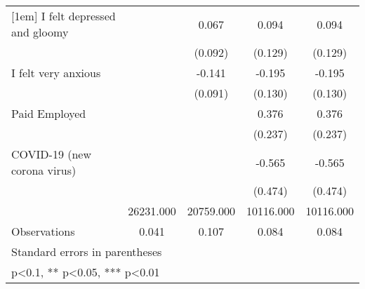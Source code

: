 {\begin{tabular}{l*{4}{c}}
[1em]
I felt depressed and gloomy&            &    0.067   &    0.094   &    0.094   \\
                &            &  (0.092)   &  (0.129)   &  (0.129)   \\
[1em]
I felt very anxious&            &   -0.141   &   -0.195   &   -0.195   \\
                &            &  (0.091)   &  (0.130)   &  (0.130)   \\
[1em]
Paid Employed   &            &            &    0.376   &    0.376   \\
                &            &            &  (0.237)   &  (0.237)   \\
[1em]
COVID-19 (new corona virus)&            &            &   -0.565   &   -0.565   \\
                &            &            &  (0.474)   &  (0.474)   \\
\hline
\hspace{2mm}    &26231.000   &20759.000   &10116.000   &10116.000   \\
Observations    &    0.041   &    0.107   &    0.084   &    0.084   \\
\hline\hline
\multicolumn{5}{l}{\footnotesize Standard errors in parentheses}\\
\multicolumn{5}{l}{\footnotesize * p<0.1, ** p<0.05, *** p<0.01}\\
\end{tabular}
}
